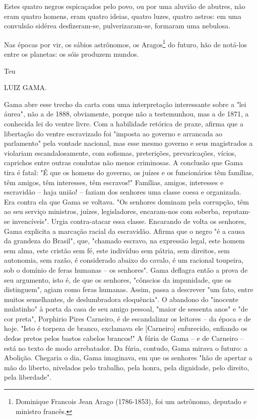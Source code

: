 Estes quatro negros espicaçados pelo povo, ou por uma aluvião de
abutres, não eram quatro homens, eram quatro ideias, quatro luzes,
quatro astros: em uma convulsão sidérea desfizeram-se, pulverizaram-se,
formaram uma nebulosa.

Nas épocas por vir, os sábios astrônomos, os Aragos\footnote{Dominique
  Francois Jean Arago (1786-1853), foi um astrônomo, deputado e ministro
  francês.} do futuro, hão
de notá-los entre os planetas: os sóis produzem mundos.

Teu

LUIZ GAMA.

\pagebreak
\mbox{}\vfill
\thispagestyle{empty}

{\small\noindent
Gama abre esse trecho da carta com uma interpretação interessante
sobre a "lei áurea", não a de 1888, obviamente, porque não a
testemunhou, mas a de 1871, a conhecida lei do ventre livre. Com a
habilidade retórica de praxe, afirma que a libertação do ventre
escravizado foi "imposta ao governo e arrancada ao parlamento" pela
vontade nacional, mas esse mesmo governo e seus magistrados a violariam
escandalosamente, com sofismas, preterições, prevaricações, vícios,
caprichos entre outras condutas não menos criminosas. A conclusão que
Gama tira é fatal: "É que os homens do governo, os juízes e os
funcionários têm famílias, têm amigos, têm interesses, têm escravos!"
Famílias, amigos, interesses e escravidão -- haja união! -- faziam dos
senhores uma classe coesa e organizada. Era contra ela que Gama se
voltava. "Os senhores dominam pela corrupção, têm ao seu serviço
ministros, juízes, legisladores, encaram-nos com soberba, reputam-se
invencíveis". Urgia contra-atacar essa classe. Encarando de volta os
senhores, Gama explicita a marcação racial da escravidão. Afirma que o
negro "é a causa da grandeza do Brasil", que, "chamado escravo, na
expressão legal, este homem sem alma, este cristão sem fé, este
indivíduo sem pátria, sem direitos, sem autonomia, sem razão, é
considerado abaixo do cavalo, é um racional toupeira, sob o domínio de
feras humanas -- os senhores". Gama deflagra então a prova de seu
argumento, isto é, de que os senhores, "cônscios da impunidade, que os
distinguem", agiam como feras humanas. Assim, passa a descrever "um
fato, entre muitos semelhantes, de deslumbradora eloquência". O abandono
do "inocente mulatinho" à porta da casa de seu amigo pessoal, "maior de
sessenta anos" e "de cor preta", Porphirio Pires Carneiro, é de
escandalizar os leitores -- da época e de hoje. "Isto é torpeza de
branco, exclamava ele {[}Carneiro{]} enfurecido, enfiando os dedos
pretos pelos bastos cabelos brancos!" A fúria de Gama -- e de Carneiro
-- está no texto de modo arrebatador. Da fúria, contudo, Gama mirava o
futuro: a Abolição. Chegaria o dia, Gama imaginava, em que os senhores
"hão de apertar a mão do liberto, nivelados pelo trabalho, pela honra,
pela dignidade, pelo direito, pela liberdade". }

